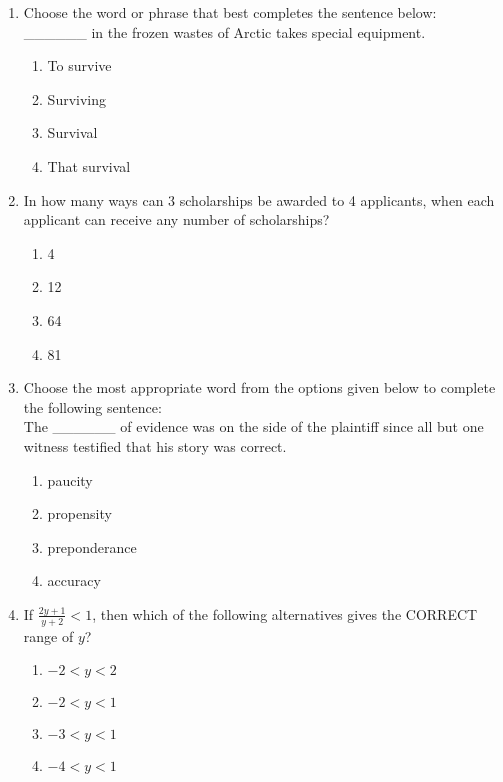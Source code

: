 \documentclass[journal,9pt,onecolumn]{IEEEtran}
\begin{document}
\begin{enumerate}
\item Choose the word or phrase that best completes the sentence below:\\ \_\_\_\_\_\_ in the frozen wastes of Arctic takes special equipment.
   \begin{multicols}{4}
   \begin{enumerate}
       \item To survive
       \item Surviving
       \item Survival
       \item That survival
   \end{enumerate}
   \end{multicols}


\item In how many ways can 3 scholarships be awarded to 4 applicants, when each applicant can receive any number of scholarships?
   \begin{multicols}{4}
   \begin{enumerate}
       \item 4
       \item 12
       \item 64
       \item 81
   \end{enumerate}
   \end{multicols}

\item Choose the most appropriate word from the options given below to complete the following sentence:\\ The \_\_\_\_\_\_ of evidence was on the side of the plaintiff since all but one witness testified that his story was correct.
   \begin{multicols}{4}
   \begin{enumerate}
       \item paucity
       \item propensity
       \item preponderance
       \item accuracy
   \end{enumerate}
   \end{multicols}


\item If $\frac{2y+1}{y+2}<1$, then which of the following alternatives gives the CORRECT range of $y$?
   \begin{multicols}{4}
   \begin{enumerate}
       \item $-2 < y < 2$
       \item $-2 < y < 1$
       \item $-3 < y < 1$
       \item $-4 < y < 1$
   \end{enumerate}
   \end{multicols}


\end{enumerate}
\end{document}
